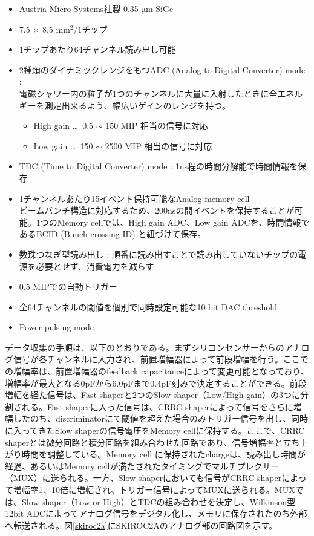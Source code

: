  \begin{itemize}
 	\item Austria Micro Systems社製 0.35 $\mathrm{\mu m}$ SiGe
	\item 7.5 $\times$ 8.5 ${\mathrm{mm}^2} /1チップ$
	\item 1チップあたり64チャンネル読み出し可能
	\item 2種類のダイナミックレンジをもつADC (Analog to Digital Converter) mode :\\
		電磁シャワー内の粒子が1つのチャンネルに大量に入射したときに全エネルギーを測定出来るよう、幅広いゲインのレンジを持つ。
		\begin{itemize}
			\item High gain \ldots \ 0.5 $\sim$ 150 MIP 相当の信号に対応
			\item Low gain \ldots \ 150 $\sim$ 2500 MIP 相当の信号に対応
		\end{itemize}
	\item TDC (Time to Digital Converter) mode : 1ns程の時間分解能で時間情報を保存
	\item 1チャンネルあたり15イベント保持可能なAnalog memory cell\\
		ビームバンチ構造に対応するため、200nsの間イベントを保持することが可能。1つのMemory cellでは、High gain ADC、Low gain ADCを、時間情報であるBCID (Bunch crossing ID) と紐づけて保存。
	\item 数珠つなぎ型読み出し : 順番に読み出すことで読み出していないチップの電源を必要とせず、消費電力を減らす
	\item 0.5 MIPでの自動トリガー
	\item 全64チャンネルの閾値を個別で同時設定可能な10 bit DAC threshold
	\item Power pulsing mode
 \end{itemize}
データ収集の手順は、以下のとおりである。まずシリコンセンサーからのアナログ信号が各チャンネルに入力され、前置増幅器によって前段増幅を行う。ここでの増幅率は、前置増幅器のfeedback capacitanceによって変更可能となっており、増幅率が最大となる0pFから6.0pFまで0.4pF刻みで決定することができる。前段増幅を経た信号は、Fast shaperと2つのSlow shaper（Low/High gain）の3つに分割される。Fast shaperに入った信号は、CRRC shaperによって信号をさらに増幅したのち、discriminatorにて閾値を超えた場合のみトリガー信号を出し、同時に入ってきたSlow shaperの信号電圧をMemory cellに保持する。ここで、CRRC shaperとは微分回路と積分回路を組み合わせた回路であり、信号増幅率と立ち上がり時間を調整している。Memory cell に保持されたchargeは、読み出し時間が経過、あるいはMemory cellが満たされたタイミングでマルチプレクサー（MUX）に送られる。一方、Slow shaperにおいても信号がCRRC shaperによって増幅率1、10倍に増幅され、トリガー信号によってMUXに送られる。MUXでは、Slow shaper（Low or High）とTDCの組み合わせを決定し、Wilkinson型12bit ADCによってアナログ信号をデジタル化し、メモリに保存されたのち外部へ転送される。図\ref{skiroc2a}にSKIROC2Aのアナログ部の回路図を示す。
